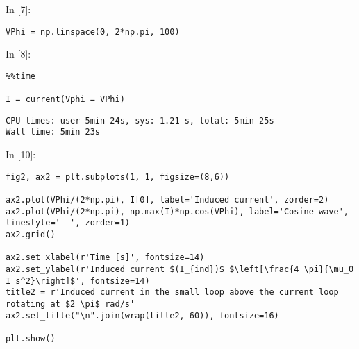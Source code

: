 \documentclass[11pt]{article}
\newif\ifcode
\newif\ifleftmargins
\newlength{\promptlength}
\newcommand{\prompt}[3]{
        \needspace{1.1cm}
        \settowidth{\promptlength}{ #1 [#3] }
        \ifleftmargins\hspace{-\promptlength}\hspace{-5pt}\fi
        {\color{#2}#1 [#3]:}
        \ifleftmargins\vspace{-2.7ex}\fi
    }
\begin{document}
    
\prompt{In}{incolor}{7}
\codetrue
\begin{tcolorbox}[breakable, size=fbox, boxrule=1pt, pad at break*=1mm, colback=cellbackground, colframe=cellborder]
\begin{verbatim}
VPhi = np.linspace(0, 2*np.pi, 100) 
\end{verbatim}
\end{tcolorbox}
\codefalse

    
\prompt{In}{incolor}{8}
\codetrue
\begin{tcolorbox}[breakable, size=fbox, boxrule=1pt, pad at break*=1mm, colback=cellbackground, colframe=cellborder]
\begin{verbatim}
%%time

I = current(Vphi = VPhi)
\end{verbatim}
\end{tcolorbox}
\codefalse

    \begin{Verbatim}[commandchars=\\\{\}]
CPU times: user 5min 24s, sys: 1.21 s, total: 5min 25s
Wall time: 5min 23s

    \end{Verbatim}

    
\prompt{In}{incolor}{10}
\codetrue
\begin{tcolorbox}[breakable, size=fbox, boxrule=1pt, pad at break*=1mm, colback=cellbackground, colframe=cellborder]
\begin{verbatim}
fig2, ax2 = plt.subplots(1, 1, figsize=(8,6))

ax2.plot(VPhi/(2*np.pi), I[0], label='Induced current', zorder=2)
ax2.plot(VPhi/(2*np.pi), np.max(I)*np.cos(VPhi), label='Cosine wave', linestyle='--', zorder=1)
ax2.grid()

ax2.set_xlabel(r'Time [s]', fontsize=14)
ax2.set_ylabel(r'Induced current $(I_{ind})$ $\left[\frac{4 \pi}{\mu_0 I s^2}\right]$', fontsize=14)
title2 = r'Induced current in the small loop above the current loop rotating at $2 \pi$ rad/s'
ax2.set_title("\n".join(wrap(title2, 60)), fontsize=16)

plt.show()
\end{verbatim}
\end{tcolorbox}
\codefalse

    \begin{center}
    \end{center}
    { \hspace*{\fill} \\}
    

    
    
    
    
\end{document}
